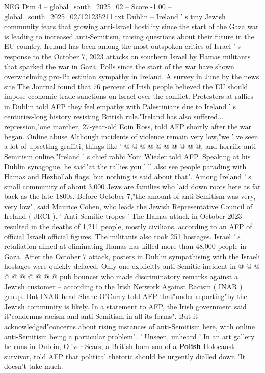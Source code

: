 \begin{textsample}{NEG Dim 4 – global\_south\_2025\_02 – Score -1.00 – global\_south\_2025\_02/121235211.txt}  \label{ex:f4_neg_431}
Dublin -- Ireland ' s tiny Jewish community fears that growing anti-Israel hostility since the start of the Gaza war is leading to increased anti-Semitism, raising questions about their future in the EU country.
Ireland has been among the most outspoken critics of Israel ' s response to the October 7, 2023 attacks on southern Israel by Hamas militants that sparked the war in Gaza.
Polls since the start of the war have shown overwhelming pro-Palestinian sympathy in Ireland.
A survey in June by the news site The Journal found that 76 percent of Irish people believed the EU should impose economic trade sanctions on Israel over the conflict.
Protesters at rallies in Dublin told AFP they feel empathy with Palestinians due to Ireland ' s centuries-long history resisting British rule."Ireland has also suffered... repression,"one marcher, 27-year-old Eoin Ross, told AFP shortly after the war began.
Online abuse Although incidents of violence remain very low,"we ' ve seen a lot of upsetting graffiti, things like ' @ @ @ @ @ @ @ @ @ @, and horrific anti-Semitism online,"Ireland ' s chief rabbi Yoni Wieder told AFP.
Speaking at his Dublin synagogue, he said"at the rallies you ' ll also see people parading with Hamas and Hezbollah flags, but nothing is said about that".
Among Ireland ' s small community of about 3,000 Jews are families who laid down roots here as far back as the late 1800s.
Before October 7,"the amount of anti-Semitism was very, very low", said Maurice Cohen, who leads the Jewish Representative Council of Ireland ( JRCI ). ' Anti-Semitic tropes ' The Hamas attack in October 2023 resulted in the deaths of 1,211 people, mostly civilians, according to an AFP of official Israeli official figures.
The militants also took 251 hostages.
Israel ' s retaliation aimed at eliminating Hamas has killed more than 48,000 people in Gaza.
After the October 7 attack, posters in Dublin sympathising with the Israeli hostages were quickly defaced.
Only one explicitly anti-Semitic incident in @ @ @ @ @ @ @ @ @ @ pub bouncer who made discriminatory remarks against a Jewish customer -- according to the Irish Network Against Racism ( INAR ) group.
But INAR head Shane O'Curry told AFP that"under-reporting"by the Jewish community is likely.
In a statement to AFP, the Irish government said it"condemns racism and anti-Semitism in all its forms".
But it acknowledged"concerns about rising instances of anti-Semitism here, with online anti-Semitism being a particular problem". ' Unseen, unheard ' In an art gallery he runs in Dublin, Oliver Sears, a British-born son of a \textbf{Polish} Holocaust survivor, told AFP that political rhetoric should be urgently dialled down."It doesn't take much.

\end{textsample}
